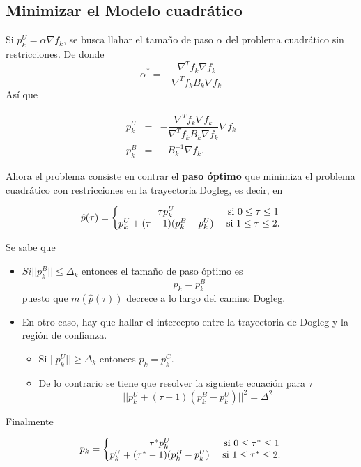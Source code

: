 \documentclass[11pt,letterpaper]{article}
\theoremstyle{definition}
\theoremstyle{definition}
\theoremstyle{definition}
\begin{document}
\subsection{Minimizar el Modelo cuadrático}
Si $ p_k^U = \alpha \nabla f_k $, se busca llahar el tamaño de paso $ \alpha $ del problema cuadrático sin restricciones. De donde
\begin{equation*}
	\alpha^* = - \dfrac{\nabla^T f_k \nabla f_k}{\nabla^T f_k B_k \nabla f_k}
\end{equation*}
Así que
\begin{shaded*}
	\begin{eqnarray}
		p_k^U & = & - \dfrac{\nabla^T f_k \nabla f_k}{\nabla^T f_k B_k \nabla f_k} \nabla f_k \\
		p_k^B & = & - B_k^{-1} \nabla f_k.
	\end{eqnarray}
\end{shaded*}
Ahora el problema consiste en contrar el \textbf{paso óptimo} que minimiza el problema cuadrático con restricciones en la trayectoria Dogleg, es decir, en
\begin{shaded*}
	\begin{equation}
		\hat{p}(\tau) = \left\{\begin{matrix}
							\tau p_k^U & \textup{ si } 0 \leq \tau \leq 1 \\
							p_k^U + (\tau -1) (p_k^B - p_k^U) & \textup{ si } 1 \leq \tau \leq 2.
						\end{matrix}\right.
	\end{equation}
\end{shaded*}
Se sabe que
\begin{itemize}
	\item $ Si || p_k^B || \leq \Delta_k $ entonces el tamaño de paso óptimo es
	\[ p_k = p_k^B \]
	puesto que $ m(\hat{p}(\tau)) $ decrece a lo largo del camino Dogleg.
	\item En otro caso, hay que hallar el intercepto entre la trayectoria de Dogleg y la región de confianza.
	\begin{itemize}
		\item Si $ || p_k^U|| \geq  \Delta_k $ entonces $ p_k = p_k^C $.
		\item De lo contrario se tiene que resolver la siguiente ecuación para $ \tau $
		\[ || p_k^U + (\tau -1) (p_k^B - p_k^U) || ^2 = \Delta^2 \] 
	\end{itemize}
\end{itemize}
Finalmente
\begin{shaded*}
	\begin{equation}
	p_k = \left\{\begin{matrix}
		\tau^* p_k^U & \textup{ si } 0 \leq \tau^* \leq 1 \\
		p_k^U + (\tau^* -1) (p_k^B - p_k^U) & \textup{ si } 1 \leq \tau^* \leq 2.
	\end{matrix}\right.
\end{equation}
\end{shaded*}
\end{document}
